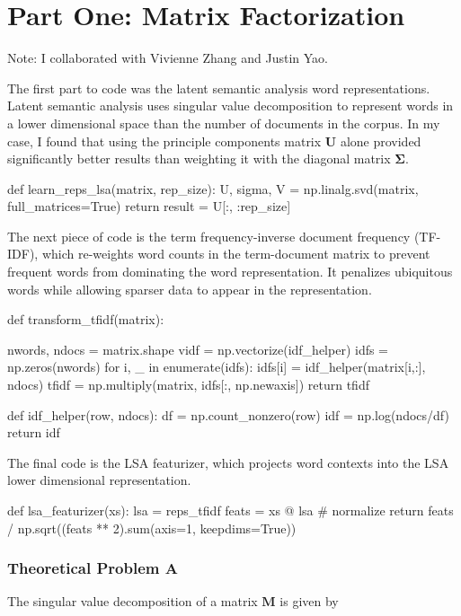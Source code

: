 \chapter*{Part One: Matrix Factorization}

Note: I collaborated with Vivienne Zhang and Justin Yao.

The first part to code was the latent semantic analysis word representations. Latent semantic analysis uses singular value decomposition to represent words in a lower dimensional space than the number of documents in the corpus. In my case, I found that using the principle components matrix $\bm{U}$ alone provided significantly better results than weighting it with the diagonal matrix $\bm{\Sigma}$.

\begin{python}
    def learn_reps_lsa(matrix, rep_size):
    U, sigma, V = np.linalg.svd(matrix, full_matrices=True)
    return result = U[:, :rep_size]
\end{python}

The next piece of code is the term frequency-inverse document frequency (TF-IDF), which re-weights word counts in the term-document matrix to prevent frequent words from dominating the word representation. It penalizes ubiquitous words while allowing sparser data to appear in the representation.

\begin{python}
    def transform_tfidf(matrix):

    nwords, ndocs = matrix.shape
    vidf = np.vectorize(idf_helper)
    idfs = np.zeros(nwords)
    for i, _ in enumerate(idfs):
    idfs[i] = idf_helper(matrix[i,:], ndocs)
    tfidf = np.multiply(matrix, idfs[:, np.newaxis])
    return tfidf

    def idf_helper(row, ndocs):
    df = np.count_nonzero(row)
    idf = np.log(ndocs/df)
    return idf
\end{python}

The final code is the LSA featurizer, which projects word contexts into the LSA lower dimensional representation.

\begin{python}
    def lsa_featurizer(xs):
    lsa = reps_tfidf
    feats = xs @ lsa
    # normalize
    return feats / np.sqrt((feats ** 2).sum(axis=1, keepdims=True))
\end{python}

\subsection*{Theoretical Problem A}
The singular value decomposition of a matrix $\bm{M}$ is given by

